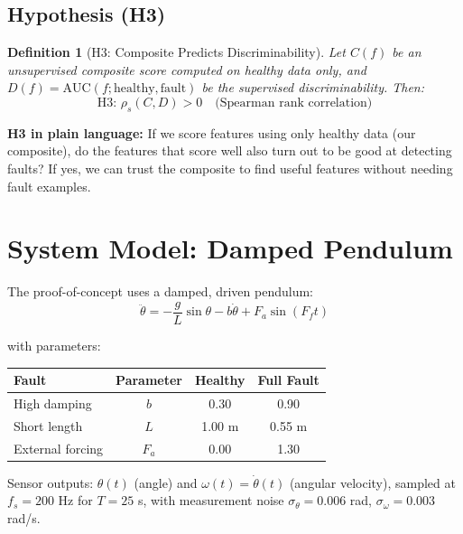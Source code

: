 \documentclass[11pt,a4paper]{article}
\newtheorem{definition}{Definition}
\begin{document}
\subsection{Hypothesis (H3)}

\begin{definition}[H3: Composite Predicts Discriminability]
Let $C(f)$ be an unsupervised composite score computed on healthy data only,
and $D(f) = \text{AUC}(f; \text{healthy}, \text{fault})$ be the supervised
discriminability. Then:
\[
\text{H3: } \rho_s(C, D) > 0 \quad \text{(Spearman rank correlation)}
\]
\end{definition}

\begin{plainbox}
\textbf{H3 in plain language:} If we score features using only healthy data
(our composite), do the features that score well also turn out to be good at
detecting faults? If yes, we can trust the composite to find useful features
without needing fault examples.
\end{plainbox}

\section{System Model: Damped Pendulum}

The proof-of-concept uses a damped, driven pendulum:
\begin{equation}
\ddot{\theta} = -\frac{g}{L}\sin\theta - b\dot{\theta} + F_a\sin(F_f t)
\label{eq:pendulum}
\end{equation}

with parameters:
\begin{center}
\begin{tabular}{lccc}
\toprule
\textbf{Fault} & \textbf{Parameter} & \textbf{Healthy} & \textbf{Full Fault} \\
\midrule
High damping & $b$ & 0.30 & 0.90 \\
Short length & $L$ & 1.00 m & 0.55 m \\
External forcing & $F_a$ & 0.00 & 1.30 \\
\bottomrule
\end{tabular}
\end{center}

Sensor outputs: $\theta(t)$ (angle) and $\omega(t) = \dot{\theta}(t)$
(angular velocity), sampled at $f_s = 200$ Hz for $T = 25$ s, with
measurement noise $\sigma_\theta = 0.006$ rad,
$\sigma_\omega = 0.003$ rad/s.
\end{document}
